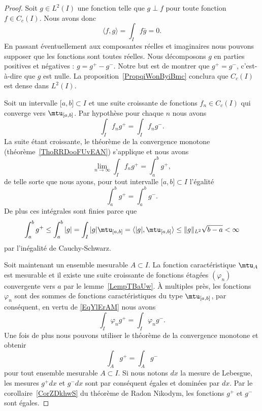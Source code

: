 \begin{proof}
    Soit \( g\in L^2(I)\) une fonction telle que \( g\perp f\) pour toute fonction \( f\in C_c(I)\). Nous avons donc
    \begin{equation}
        \langle f, g\rangle =\int_If\bar g=0.
    \end{equation}
    En passant éventuellement aux composantes réelles et imaginaires nous pouvons supposer que les fonctions sont toutes réelles. Nous décomposons \( g\) en parties positives et négatives : \( g=g^+-g^-\). Notre but est de montrer que \( g^+=g^-\), c'est-à-dire que \( g\) est nulle. La proposition~\ref{PropqiWonByiBmc} conclura que \( C_c(I)\) est dense dans \( L^2(I)\).

    Soit un intervalle \( \mathopen[ a , b \mathclose]\subset I\) et une suite croissante de fonctions \( f_n\in C_c(I)\) qui converge vers \( \mtu_{\mathopen[ a , b \mathclose]}\). Par hypothèse pour chaque \( n\) nous avons
    \begin{equation}
        \int_If_ng^+=\int_I f_ng^-.
    \end{equation}
    La suite étant croissante, le théorème de la convergence monotone (théorème~\ref{ThoRRDooFUvEAN}) s'applique et nous avons
    \begin{equation}
        \lim_{n\to \infty} \int_I f_ng^+=\int_a^bg^+,
    \end{equation}
    de telle sorte que nous ayons, pour tout intervalle \( \mathopen[ a , b \mathclose]\subset I\) l'égalité
    \begin{equation}        \label{EqYlErAM}
        \int_a^bg^+=\int_a^bg^-.
    \end{equation}
    De plus ces intégrales sont finies parce que
    \begin{equation}
        \int_a^b g^+\leq\int_a^b| g |=\int_I| g |\mtu_{\mathopen[ a , b \mathclose]}=\langle | g |, \mtu_{\mathopen[ a , b \mathclose]}\rangle \leq \| g \|_{L^2}\sqrt{b-a}<\infty
    \end{equation}
    par l'inégalité de Cauchy-Schwarz.

    Soit maintenant un ensemble mesurable \( A\subset I\). La fonction caractéristique \( \mtu_A\) est mesurable et il existe une suite croissante de fonctions étagées \( (\varphi_n)\) convergente vers \( a\) par le lemme~\ref{LempTBaUw}. À multiples près, les fonctions \( \varphi_n\) sont des sommes de fonctions caractéristiques du type \( \mtu_{\mathopen[ a , b \mathclose]}\), par conséquent, en vertu de \eqref{EqYlErAM} nous avons
    \begin{equation}
        \int_I\varphi_ng^+=\int_I\varphi_ng^-.
    \end{equation}
    Une fois de plus nous pouvons utiliser le théorème de la convergence monotone et obtenir
    \begin{equation}
        \int_Ag^+=\int_A g^-
    \end{equation}
    pour tout ensemble mesurable \( A\subset I\). Si nous notons \( dx\) la mesure de Lebesgue, les mesures \( g^+dx\) et \( g^-dx\) sont par conséquent égales et dominées par \( dx\). Par le corollaire~\ref{CorZDkhwS} du théorème de Radon Nikodym, les fonctions \( g^+\) et \( g^-\) sont égales.
\end{proof}

